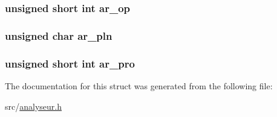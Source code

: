 \subsubsection[{\texorpdfstring{ar\+\_\+op}{ar_op}}]{\setlength{\rightskip}{0pt plus 5cm}unsigned short int ar\+\_\+op}\hypertarget{struct__arphdr_a35a7ee09725d99049429b6f525308ec2}{}\label{struct__arphdr_a35a7ee09725d99049429b6f525308ec2}
\subsubsection[{\texorpdfstring{ar\+\_\+pln}{ar_pln}}]{\setlength{\rightskip}{0pt plus 5cm}unsigned char ar\+\_\+pln}\hypertarget{struct__arphdr_a2d8f7b178fa0a800527c502dd398abb0}{}\label{struct__arphdr_a2d8f7b178fa0a800527c502dd398abb0}
\subsubsection[{\texorpdfstring{ar\+\_\+pro}{ar_pro}}]{\setlength{\rightskip}{0pt plus 5cm}unsigned short int ar\+\_\+pro}\hypertarget{struct__arphdr_a6740bfa6a87474b777a9ee7d592c777c}{}\label{struct__arphdr_a6740bfa6a87474b777a9ee7d592c777c}


The documentation for this struct was generated from the following file\+:\begin{DoxyCompactItemize}
\item 
src/\hyperlink{analyseur_8h}{analyseur.\+h}\end{DoxyCompactItemize}
